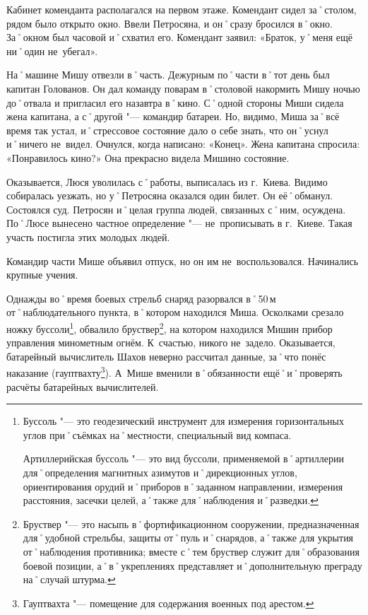 Кабинет коменданта располагался на первом этаже. Комендант сидел за˚столом, рядом было открыто окно. Ввели Петросяна, и он˚сразу бросился в˚окно. За˚окном был часовой и˚схватил его. Комендант заявил: «Браток, у˚меня ещё ни˚один не~убегал». 

На˚машине Мишу отвезли в˚часть. Дежурным по˚части в˚тот день был капитан Голованов. Он дал команду поварам в˚столовой накормить Мишу ночью до˚отвала и пригласил его назавтра в˚кино. С˚одной стороны Миши сидела жена капитана, а с˚другой "--- командир батареи. Но, видимо, Миша за˚всё время так устал, и˚стрессовое состояние дало о себе знать, что он˚уснул и˚ничего не~видел. Очнулся, когда написано: «Конец». Жена капитана спросила: «Понравилось кино?» Она прекрасно видела Мишино состояние. 

Оказывается, Люся уволилась с˚работы, выписалась из г.~Киева. Видимо собиралась уезжать, но у˚Петросяна оказался один билет. Он её˚обманул. Состоялся суд. Петросян и˚целая группа людей, связанных с˚ним, осуждена. По˚Люсе вынесено частное определение "--- не~прописывать в г.~Киеве. Такая участь постигла этих молодых людей.

Командир части Мише объявил отпуск, но он им не~воспользовался. Начинались крупные учения. 

Однажды во˚время боевых стрельб снаряд разорвался в˚50\,м от˚наблюдательного пункта, в˚котором находился Миша. Осколками срезало ножку буссоли\footnote{Буссоль "--- это геодезический инструмент для измерения горизонтальных углов при˚съёмках на˚местности, специальный вид компаса. 

Артиллерийская буссоль "--- это вид буссоли, применяемой в˚артиллерии для˚определения магнитных азимутов и˚дирекционных углов, ориентирования орудий и˚приборов в˚заданном направлении, измерения расстояния, засечки целей, а˚также для˚наблюдения и˚разведки.}, обвалило бруствер\footnote{Бруствер "--- это насыпь в˚фортификационном сооружении, предназначенная для˚удобной стрельбы, защиты от˚пуль и˚снарядов, а˚также для укрытия от˚наблюдения противника; вместе с˚тем бруствер служит для˚образования боевой позиции, а˚в˚укреплениях представляет и˚дополнительную преграду на˚случай штурма.}, на котором находился Мишин прибор управления минометным огнём. К~счастью, никого не~задело. Оказывается, батарейный вычислитель Шахов неверно рассчитал данные, за˚что понёс наказание (гауптвахту\footnote{Гауптвахта "--- помещение для содержания военных под арестом.}). А~Мише вменили в˚обязанности ещё˚и˚проверять расчёты батарейных вычислителей. 

